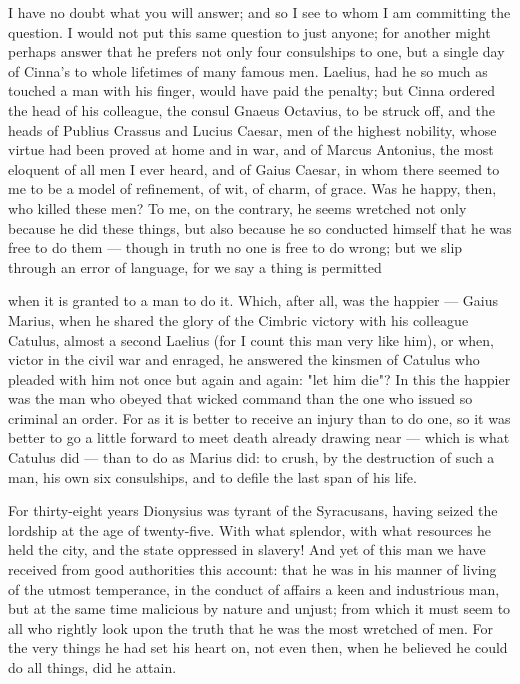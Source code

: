  I have no doubt what you will answer; and so I see to whom I am committing the question. I would not put this same question to just anyone; for another might perhaps answer that he prefers not only four consulships to one, but a single day of Cinna's to whole lifetimes of many famous men. Laelius, had he so much as touched a man with his finger, would have paid the penalty; but Cinna ordered the head of his colleague, the consul Gnaeus Octavius, to be struck off, and the heads of Publius Crassus and Lucius Caesar, men of the highest nobility, whose virtue had been proved at home and in war, and of Marcus Antonius, the most eloquent of all men I ever heard, and of Gaius Caesar, in whom there seemed to me to be a model of refinement, of wit, of charm, of grace. Was he happy, then, who killed these men? To me, on the contrary, he seems wretched not only because he did these things, but also because he so conducted himself that he was free to do them — though in truth no one is free to do wrong; but we slip through an error of language, for we say a thing is permitted

 when it is granted to a man to do it. Which, after all, was the happier — Gaius Marius, when he shared the glory of the Cimbric victory with his colleague Catulus, almost a second Laelius (for I count this man very like him), or when, victor in the civil war and enraged, he answered the kinsmen of Catulus who pleaded with him not once but again and again: "let him die"? In this the happier was the man who obeyed that wicked command than the one who issued so criminal an order. For as it is better to receive an injury than to do one, so it was better to go a little forward to meet death already drawing near — which is what Catulus did — than to do as Marius did: to crush, by the destruction of such a man, his own six consulships, and to defile the last span of his life.

 For thirty-eight years Dionysius was tyrant of the Syracusans, having seized the lordship at the age of twenty-five. With what splendor, with what resources he held the city, and the state oppressed in slavery! And yet of this man we have received from good authorities this account: that he was in his manner of living of the utmost temperance, in the conduct of affairs a keen and industrious man, but at the same time malicious by nature and unjust; from which it must seem to all who rightly look upon the truth that he was the most wretched of men. For the very things he had set his heart on, not even then, when he believed he could do all things, did he attain.

